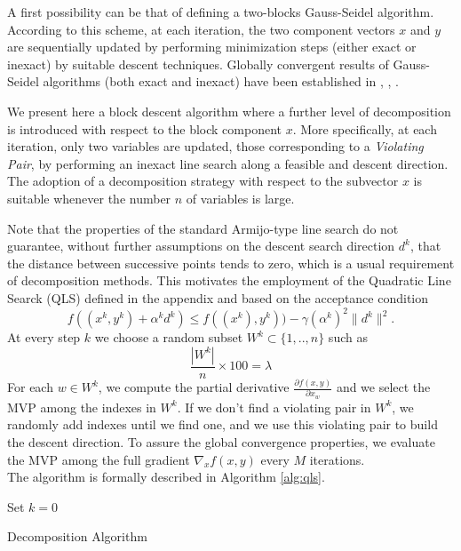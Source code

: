 A first possibility can be that of defining a two-blocks Gauss-Seidel algorithm.
According to this scheme, at each iteration, the two component vectors $x$ and $y$ are
sequentially updated by performing  minimization steps (either exact or inexact) by  suitable descent techniques.
Globally convergent results of Gauss-Seidel algorithms (both exact and inexact) have been established in \cite{}, \cite{}, \cite{}.

We present here a block descent algorithm where a further level of decomposition is
introduced with respect to the block component $x$. 
More specifically, at each iteration, only two variables are updated, those corresponding
to a {\it Violating Pair}, by performing an inexact line search along a feasible and descent direction.
The adoption of a decomposition strategy with respect to the subvector $x$ is suitable
whenever the number $n$ of variables is large.

Note that the properties of the standard Armijo-type line search do not guarantee, without further assumptions
on the descent search direction $d^k$, that the distance between successive points tends to zero, which is a usual requirement of decomposition methods. This motivates the employment of the Quadratic Line Searck (QLS) defined in the appendix and based on the acceptance condition
$$
f((x^k,y^k)+\alpha^kd^k)\le f((x^k),y^k))-\gamma (\alpha^k)^2\|d^k\|^2.
$$
At every step $k$ we choose a random subset $W^k\subset \{1,..,n\}$ such as
\begin{equation}\label{eq:lambda}
\frac{|W^k|}{n} \times 100 = \lambda
\end{equation}
For each $w \in W^k$, we compute the partial derivative $\frac{\partial f(x,y)}{\partial x_w}$ and we select the MVP among the indexes in $W^k$. If we don't find a violating pair in $W^k$, we randomly add indexes until we find one, and we use this violating pair to build the descent direction. To assure the global convergence properties, we evaluate the MVP among the full gradient $\nabla_x f(x,y)$ every $M$ iterations. \\
The algorithm is formally described in Algorithm \ref{alg:qls}.

\begin{algorithm}[ht]
 Set $k = 0$\\
 \caption{Decomposition Algorithm}
 \label{alg:qls}
\end{algorithm}


